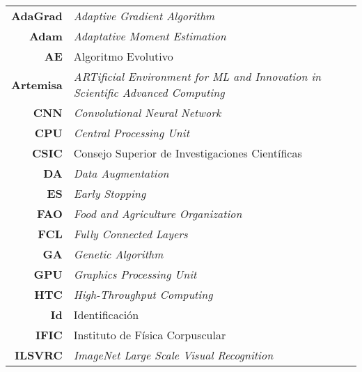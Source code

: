 \begin{table}[h]
\begin{tabular}{rl}
\textbf{AdaGrad}  & \textit{Adaptive Gradient Algorithm}                                                   \\
\textbf{Adam}     & \textit{Adaptative Moment Estimation }                                                 \\
\textbf{AE}       & Algoritmo Evolutivo                                                           \\
\textbf{Artemisa} & \textit{ARTificial Environment for ML and Innovation in Scientific Advanced Computing} \\
\textbf{CNN}      & \textit{Convolutional Neural Network}                                                  \\
\textbf{CPU}      & \textit{Central Processing Unit }                                                      \\
\textbf{CSIC}     & Consejo Superior de Investigaciones Científicas                               \\
\textbf{DA}       & \textit{Data Augmentation}                                                             \\
\textbf{ES}       & \textit{Early Stopping}                                                                \\
\textbf{FAO}      & \textit{Food and Agriculture Organization}                                             \\
\textbf{FCL}      & \textit{Fully Connected Layers}                                                        \\
\textbf{GA}       & \textit{Genetic Algorithm}                                                             \\
\textbf{GPU}      & \textit{Graphics Processing Unit}                                                      \\
\textbf{HTC}      & \textit{High-Throughput Computing}                                                     \\
\textbf{Id}       & Identificación                                                                \\
\textbf{IFIC}     & Instituto de Física Corpuscular                                               \\
\textbf{ILSVRC}   & \textit{ImageNet Large Scale Visual Recognition}                                       \\

\end{tabular}
\end{table}
